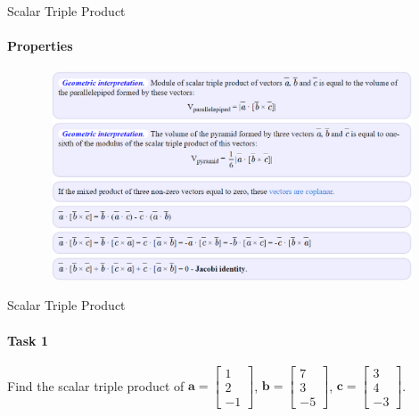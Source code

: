 \documentclass[aspectratio=169,notes]{beamer}
\begin{document}
\begin{frame}[t]{Scalar Triple Product}
\framesubtitle{Properties}
\vspace{-0.8cm}
    \begin{figure}[H]
        \centering\includegraphics[height=6.2cm,width=1\textwidth,keepaspectratio]{triple_scalar_properites.png}
        \label{fig:triple_scalar_properites.png}
    \end{figure}
\end{frame}

\begin{frame}[t]{Scalar Triple Product}
\framesubtitle{Task 1}
Find the scalar triple product of $\textbf{a}=\begin{bmatrix} 1 \\ 2 \\ -1  \end{bmatrix}$, $\textbf{b}=\begin{bmatrix} 7 \\ 3 \\ -5  \end{bmatrix}$, $\textbf{c}=\begin{bmatrix} 3 \\ 4 \\ -3  \end{bmatrix}$.
\end{frame}

\end{document}
